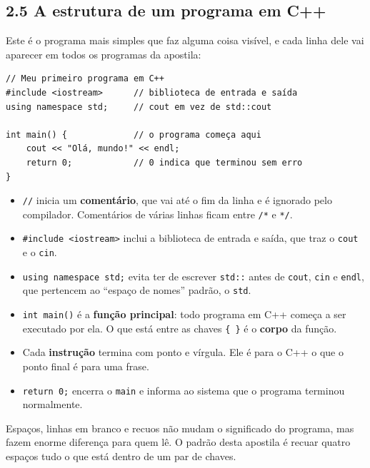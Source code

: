 \subsection{2.5 A estrutura de um programa em C++}

Este é o programa mais simples que faz alguma coisa visível, e cada linha dele vai aparecer em todos os programas da apostila:

\begin{codigo}
\begin{Verbatim}[breaklines=true, breaksymbolleft={}, fontsize=\footnotesize]
// Meu primeiro programa em C++
#include <iostream>      // biblioteca de entrada e saída
using namespace std;     // cout em vez de std::cout

int main() {             // o programa começa aqui
    cout << "Olá, mundo!" << endl;
    return 0;            // 0 indica que terminou sem erro
}
\end{Verbatim}
\end{codigo}

\begin{itemize}
  \item \texttt{//} inicia um \textbf{comentário}, que vai até o fim da linha e é ignorado pelo compilador. Comentários de várias linhas ficam entre \texttt{/*} e \texttt{*/}.
  \item \texttt{\#include <iostream>} inclui a biblioteca de entrada e saída, que traz o \texttt{cout} e o \texttt{cin}.
  \item \texttt{using namespace std;} evita ter de escrever \texttt{std::} antes de \texttt{cout}, \texttt{cin} e \texttt{endl}, que pertencem ao ``espaço de nomes'' padrão, o \texttt{std}.
  \item \texttt{int main()} é a \textbf{função principal}: todo programa em C++ começa a ser executado por ela. O que está entre as chaves \texttt{\{ \}} é o \textbf{corpo} da função.
  \item Cada \textbf{instrução} termina com ponto e vírgula. Ele é para o C++ o que o ponto final é para uma frase.
  \item \texttt{return 0;} encerra o \texttt{main} e informa ao sistema que o programa terminou normalmente.
\end{itemize}

Espaços, linhas em branco e recuos não mudam o significado do programa, mas fazem enorme diferença para quem lê. O padrão desta apostila é recuar quatro espaços tudo o que está dentro de um par de chaves.

